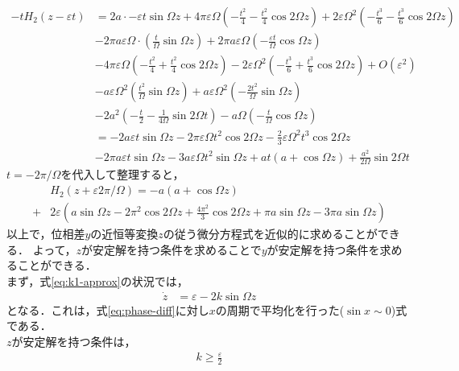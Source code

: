 \documentclass[../main]{subfiles}
\begin{document}
    \begin{align*}
        -tH_2(z-\varepsilon t)&=2a\cdot -\varepsilon t\sin\Omega z+4\pi\varepsilon\Omega\left( -\frac{t^2}{4} -\frac{t^2}{4}\cos 2\Omega z\right)+2\varepsilon\Omega^2\left( -\frac{t^3}{6} -\frac{t^3}{6}\cos 2\Omega z\right)\\
        &-2\pi a\varepsilon\Omega\cdot\left(\frac{t}{\Omega}\sin\Omega z\right)+2\pi a\varepsilon\Omega\left(-\frac{\varepsilon t}{\Omega}\cos\Omega z\right)\\
        &-4\pi\varepsilon\Omega\left(-\frac{t^2}{4}+\frac{t^2}{4}\cos 2\Omega z\right)-2\varepsilon\Omega^2\left( -\frac{t^3}{6} +\frac{t^3}{6}\cos 2\Omega z\right)+O(\varepsilon^2)\\
        &-a\varepsilon\Omega^2\left( \frac{t^2}{\Omega}\sin\Omega z \right)+a\varepsilon\Omega^2\left( -\frac{2t^2}{\Omega}\sin\Omega z \right)\\
        &-2a^2\left( -\frac{t}{2}-\frac{1}{4\Omega} \sin 2\Omega t\right)-a\Omega \left( -\frac{t}{\Omega} \cos\Omega z\right)\\
        &=-2a\varepsilon t\sin\Omega z-2\pi\varepsilon\Omega t^2\cos 2\Omega z-\frac{2}{3}\varepsilon\Omega^2t^3\cos 2\Omega z\\
        &-2\pi a\varepsilon t\sin\Omega z-3a\varepsilon\Omega t^2\sin\Omega z+at(a+\cos\Omega z)+\frac{a^2}{2\Omega}\sin 2\Omega t
    \end{align*}
    $t=-2\pi/\Omega$を代入して整理すると，
    \begin{align*}
        &H_2(z+\varepsilon 2\pi/\Omega)=-a(a+\cos\Omega z)\\
        +&2\varepsilon\left( a\sin\Omega z-2\pi^2\cos2\Omega z+\frac{4\pi^2}{3} \cos 2\Omega z+\pi a\sin\Omega z-3\pi a\sin\Omega z\right)
    \end{align*}
    以上で，位相差$y$の近恒等変換$z$の従う微分方程式を近似的に求めることができる．
    よって，$z$が安定解を持つ条件を求めることで$y$が安定解を持つ条件を求めることができる．\\
    まず，式\eqref{eq:k1-approx}の状況では，
    \begin{align*}
        \dot{z}&=\varepsilon-2k\sin\Omega z
    \end{align*}
    となる．これは，式\eqref{eq:phase-diff}に対し$x$の周期で平均化を行った($\sin x\sim 0$)式である．\\
    $z$が安定解を持つ条件は，
    \begin{align*}
        k\geq\frac{\varepsilon}{2}
    \end{align*}
\end{document}
